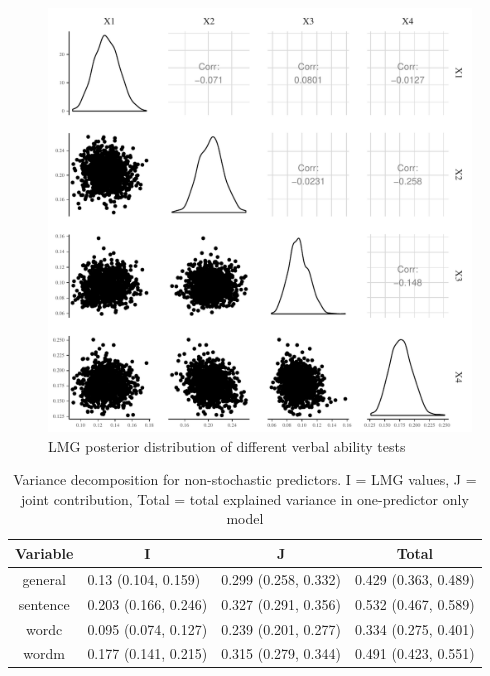 \documentclass[11pt,a4paper,twoside]{book}
\newenvironment{knitrout}{}{} %
\begin{document}
\begin{knitrout}
\color{fgcolor}\begin{figure}

{\centering \includegraphics[width=\textwidth-3cm]{figure/ch03_figempi_lmg_plot-1} 

}

\caption[LMG posterior distribution of different verbal ability tests]{LMG posterior distribution of different verbal ability tests}\label{fig:empi.lmg.plot}
\end{figure}


\end{knitrout}


\begin{table}[h]
\caption{Variance decomposition for non-stochastic predictors. I = LMG values, J = joint contribution, Total = total explained variance in one-predictor only model}
\centering
\begin{tabular}{clll}
  \toprule
  \multicolumn{1}{c}{\textbf{Variable}} & \multicolumn{1}{c}{\textbf{I}} &\multicolumn{1}{c}{\textbf{J}} & \multicolumn{1}{c}{\textbf{Total}} \\
  \hline
general & 0.13 (0.104, 0.159)  & 0.299 (0.258, 0.332)   & 0.429 (0.363, 0.489)  \\ 
sentence & 0.203 (0.166, 0.246)  & 0.327 (0.291, 0.356)   & 0.532 (0.467, 0.589)  \\ 
wordc & 0.095 (0.074, 0.127)  & 0.239 (0.201, 0.277)   & 0.334 (0.275, 0.401)  \\ 
wordm & 0.177 (0.141, 0.215)  & 0.315 (0.279, 0.344)   & 0.491 (0.423, 0.551)  \\ 
   \bottomrule
\end{tabular}
\label{tbl:empirical.ijt}
\end{table}
\end{document}
